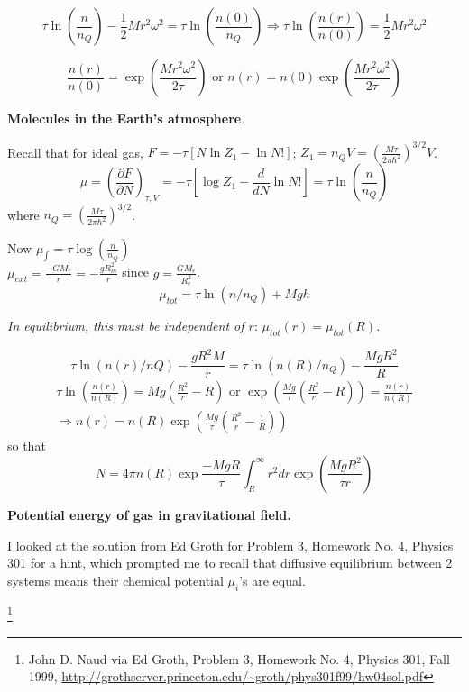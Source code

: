 \documentclass[twoside]{amsart}
\theoremstyle{plain}
\theoremstyle{definition}
\newcommand{\solutionhead}[1]
  {
   \noindent{\small\bf Solution #1.}
   }
\begin{document}
\[
\tau \ln{\left( \frac{ n }{n_Q} \right)} - \frac{1}{2} M r^2 \omega^2 = \tau \ln{ \left( \frac{n(0)}{n_Q} \right)} \Longrightarrow \tau \ln{ \left( \frac{n(r)}{n(0)} \right) } =  \frac{1}{2} M r^2 \omega^2
\]

\[
\frac{n(r)}{n(0)} = \exp{ \left( \frac{Mr^2 \omega^2}{ 2\tau} \right) } \text{ or } \boxed{ n(r) = n(0) \exp{ \left( \frac{Mr^2 \omega^2}{2\tau} \right) } }
\]



\solutionhead{2} \textbf{Molecules in the Earth's atmosphere}.

Recall that for ideal gas, $F = - \tau [ N \ln{Z_1} - \ln{N!} ]$; $Z_1 = n_Q V = \left( \frac{ M \tau}{2\pi \hbar^2} \right)^{3/2} V$.  
\[
\mu = \left( \frac{ \partial F}{ \partial N} \right)_{\tau, V} = -\tau [ \log{Z_1} - \frac{d}{dN} \ln{N!} ] = \tau \ln{ \left( \frac{n}{n_Q} \right) }
\]
where $n_Q = \left( \frac{ M \tau}{2\pi \hbar^2} \right)^{3/2}$.

Now
$\mu_{\int} = \tau \log{ \left( \frac{n}{n_Q} \right)}$ \\
$\mu_{ext} = \frac{ - GM_e}{r} =  - \frac{ gR^2_m}{ r}$ since $g = \frac{ GM_e}{R_e^2}$.  
\[
\mu_{tot} = \tau \ln{ (n/n_Q)} + Mgh
\]

\emph{In equilibrium, this must be independent of $r$}: $\mu_{tot}(r) = \mu_{tot}(R)$.  

\[
\tau \ln{ ( n(r)/nQ)} - \frac{ gR^2 M }{r} = \tau \ln{ ( n(R)/n_Q) } - \frac{ MgR^2}{R}
\]
\[
\begin{gathered}
  \tau \ln{ \left( \frac{n(r)}{ n(R)} \right) } = Mg \left( \frac{R^2}{r} - R \right) \text{ or } \exp{ \left( \frac{Mg}{\tau} \left( \frac{R^2}{r} - R \right) \right) } = \frac{n(r)}{n(R)} \\ 
  \Longrightarrow n(r) = n(R) \exp{ \left( \frac{Mg}{ \tau} \left( \frac{R^2}{r} - \frac{1}{R} \right)\right)}
\end{gathered}
\]
so that 
\[
\boxed{ N = 4\pi n(R) \exp{ \frac{ - MgR}{\tau} \int_R^{\infty} r^2 dr \exp{ \left( \frac{Mg R^2}{\tau r } \right) } } }
\]



\solutionhead{3} \textbf{Potential energy of gas in gravitational field.}  

I looked at the solution from Ed Groth \cite{EGroth99} for Problem 3, Homework No. 4, Physics 301 for a hint, which prompted me to recall that diffusive equilibrium between 2 systems means their chemical potential $\mu_i$'s are equal.  

\footnote{John D. Naud via Ed Groth, Problem 3, Homework No. 4, Physics 301, Fall 1999, \url{http://grothserver.princeton.edu/~groth/phys301f99/hw04sol.pdf} }
\end{document}
